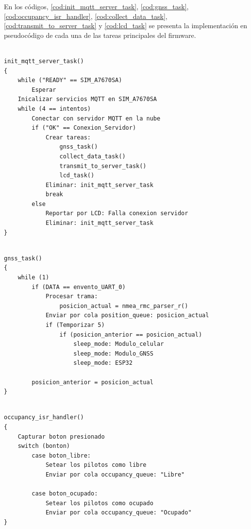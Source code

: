 En los códigos, \ref{cod:init_mqtt_server_task}, \ref{cod:gnss_task}, \ref{cod:occupancy_isr_handler}, \ref{cod:collect_data_task}, \ref{cod:transmit_to_server_task} y \ref{cod:lcd_task} se presenta la implementación en pseudocódigo de cada una de las tareas principales del firmware. 


\begin{lstlisting}[label=cod:init_mqtt_server_task, caption=Pseudocódigo de la función init\_mqtt\_server\_task().] 

init_mqtt_server_task()
{
	while ("READY" == SIM_A7670SA)
		Esperar
	Inicalizar servicios MQTT en SIM_A7670SA
	while (4 == intentos)
		Conectar con servidor MQTT en la nube
		if ("OK" == Conexion_Servidor)
			Crear tareas: 
				gnss_task()
				collect_data_task()
				transmit_to_server_task()
				lcd_task()
			Eliminar: init_mqtt_server_task
			break
		else
			Reportar por LCD: Falla conexion servidor
			Eliminar: init_mqtt_server_task
}

\end{lstlisting}

 


\begin{lstlisting}[label=cod:gnss_task, caption=Pseudocódigo de la función gnss\_task().] 

gnss_task()
{
	while (1)
		if (DATA == envento_UART_0)
			Procesar trama: 
				posicion_actual = nmea_rmc_parser_r()
			Enviar por cola position_queue: posicion_actual
			if (Temporizar 5)
				if (posicion_anterior == posicion_actual)
					sleep_mode: Modulo_celular
					sleep_mode: Modulo_GNSS
					sleep_mode: ESP32
					
		posicion_anterior = posicion_actual
}

\end{lstlisting}

 


\begin{lstlisting}[label=cod:occupancy_isr_handler, caption=Pseudocódigo de la función occupancy\_isr\_handler().] 

occupancy_isr_handler()
{
	Capturar boton presionado
	switch (bonton)
		case boton_libre: 
			Setear los pilotos como libre
			Enviar por cola occupancy_queue: "Libre"
		
		case boton_ocupado:
			Setear los pilotos como ocupado
			Enviar por cola occupancy_queue: "Ocupado"	
}

\end{lstlisting}

 

